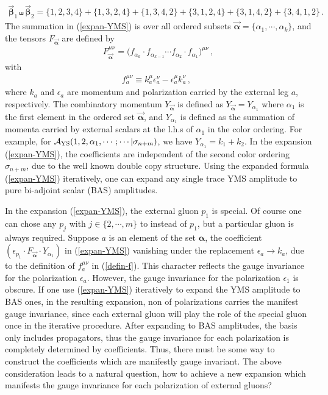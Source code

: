 \documentclass[11pt,a4paper]{article}
\newcommand{\bea}{\begin{eqnarray}}
\newcommand{\eea}{\end{eqnarray}}
\def\eref#1{(\ref{#1})}
\def\a{{\alpha}}
\def\b{{\beta}}
\begin{document}
%
\bea
\vec{\pmb{\b}}_1\shuffle \vec{\pmb{\b}}_2=\{1,2,3,4\}+\{1,3,2,4\}+\{1,3,4,2\}+\{3,1,2,4\}+\{3,1,4,2\}+\{3,4,1,2\}\,.~~~~\label{shuffle}
\eea
%
The summation in \eref{expan-YMS} is over all ordered subsets $\vec{\pmb{\a}}=\{\a_1,\cdots,\a_k\}$, and the tensors $F_{\vec{\pmb{\a}}}$ are defined by
%
\bea
F^{\mu\nu}_{\vec{\pmb{\a}}}=\Big(f_{\a_k}\cdot f_{\a_{k-1}}\cdots f_{\a_2}\cdot f_{\a_1}\Big)^{\mu\nu}\,,
\eea
%
with
%
\bea
f^{\mu\nu}_{a}\equiv k^\mu_a\epsilon^\nu_a-\epsilon^\mu_a k^\nu_a\,,~~\label{defin-f}
\eea
%
where $k_a$ and $\epsilon_a$ are momentum and polarization carried by the external leg $a$, respectively. The combinatory momentum $Y_{\vec{\pmb{\a}}}$ is defined as $Y_{\vec{\pmb{\a}}}=Y_{\a_1}$ where $\a_1$ is the first element in the ordered set $\vec{\pmb{\a}}$, and $Y_{\a_1}$ is defined as the summation of momenta carried by external scalars at the l.h.s of $\a_1$ in the color ordering. For example, for ${\cal A}_{\rm YS}(1,2,\a_1,\cdots;\cdots|\sigma_{n+m})$, we have $Y_{\a_1}=k_1+k_2$.
In the expansion \eref{expan-YMS}, the coefficients are independent of the second color ordering $\sigma_{n+m}$, due to the well known double copy structure.  Using the expanded formula \eref{expan-YMS} iteratively, one can expand any single trace YMS amplitude to pure bi-adjoint scalar (BAS) amplitudes.

In the expansion \eref{expan-YMS}, the external gluon $p_1$ is special. Of course one can chose any $p_j$ with $j\in\{2,\cdots,m\}$ to instead of $p_1$, but a particular gluon is always required. Suppose $a$ is an element of the set $\pmb{\a}$, the coefficient $(\epsilon_{p_1}\cdot F_{\vec{\pmb{\a}}}\cdot Y_{\a_1})$ in \eref{expan-YMS} vanishing under the replacement $\epsilon_a\to k_a$, due to the definition of $f_a^{\mu\nu}$ in \eref{defin-f}. This character reflects the gauge invariance for the polarization $\epsilon_a$.
However, the gauge invariance for the polarization $\epsilon_1$ is obscure. If one use \eref{expan-YMS} iteratively to expand the YMS amplitude to BAS ones, in the resulting expansion, non of polarizations carries the manifest gauge invariance, since each external gluon will play the role of the special gluon once in the iterative procedure. After expanding to BAS amplitudes, the basis only includes propagators, thus the gauge invariance for each polarization is completely determined by coefficients. Thus, there must be some way to construct the coefficients which are manifestly gauge invariant. The above consideration leads to a natural question, how to achieve a new expansion which manifests the gauge invariance for each polarization of external gluons?
\end{document}
